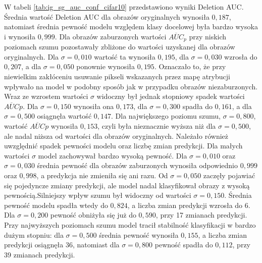 W tabeli \ref{tab:ig_sg_auc_conf_cifar10} przedstawiono wyniki Deletion AUC. Średnia wartość Deletion AUC dla obrazów oryginalnych wynosiła $0{,}187$, natomiast średnia pewność modelu względem klasy docelowej była bardzo wysoka i wynosiła $0{,}999$.
Dla obrazów zaburzonych wartości $\overline{AUC}_{p}$ przy niskich poziomach szumu pozostawały zbliżone do wartości uzyskanej dla obrazów oryginalnych. Dla $\sigma = 0{,}010$ wartość ta wynosiła $0{,}195$, dla $\sigma = 0{,}030$ wzrosła do $0{,}207$, a dla $\sigma = 0{,}050$ ponownie wynosiła $0{,}195$. Oznaczało to, że przy niewielkim zakłóceniu usuwanie pikseli wskazanych przez mapę atrybucji wpływało na model w podobny sposób jak w przypadku obrazów niezaburzonych. Wraz ze wzrostem wartości $\sigma$ widoczny był jednak stopniowy spadek wartości $\overline{AUC}{p}$. Dla $\sigma = 0{,}150$ wynosiła ona $0{,}173$, dla $\sigma = 0{,}300$ spadła do $0{,}161$, a dla $\sigma = 0{,}500$ osiągnęła wartość $0{,}147$. Dla największego poziomu szumu, $\sigma = 0{,}800$, wartość $\overline{AUC}{p}$ wynosiła $0{,}153$, czyli była nieznacznie wyższa niż dla $\sigma = 0{,}500$, ale nadal niższa od wartości dla obrazów oryginalnych. Należało również uwzględnić spadek pewności modelu oraz liczbę zmian predykcji. Dla małych wartości $\sigma$ model zachowywał bardzo wysoką pewność. Dla $\sigma = 0{,}010$ oraz $\sigma = 0{,}030$ średnia pewność dla obrazów zaburzonych wynosiła odpowiednio $0{,}999$ oraz $0{,}998$, a predykcja nie zmieniła się ani razu. Od $\sigma = 0{,}050$ zaczęły pojawiać się pojedyncze zmiany predykcji, ale model nadal klasyfikował obrazy z wysoką pewnością.Silniejszy wpływ szumu był widoczny od wartości $\sigma = 0{,}150$. Średnia pewność modelu spadła wtedy do $0{,}824$, a liczba zmian predykcji wzrosła do 6. Dla $\sigma = 0{,}200$ pewność obniżyła się już do $0{,}590$, przy 17 zmianach predykcji. Przy najwyższych poziomach szumu model tracił stabilność klasyfikacji w bardzo dużym stopniu: dla $\sigma = 0{,}500$ średnia pewność wynosiła $0{,}155$, a liczba zmian predykcji osiągnęła 36, natomiast dla $\sigma = 0{,}800$ pewność spadła do $0{,}112$, przy 39 zmianach predykcji.

